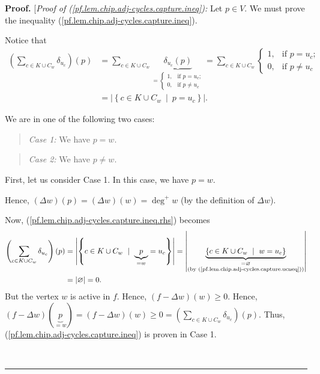 \documentclass[numbers=enddot,12pt,final,onecolumn,notitlepage]{scrartcl}%
\theoremstyle{definition}
\newenvironment{statement}{\begin{quote}}{\end{quote}}
\newenvironment{proof}[1][Proof]{\noindent\textbf{#1.} }{\ \rule{0.5em}{0.5em}}
\let\sumnonlimits\sum
\renewcommand{\sum}{\sumnonlimits\limits}
\newenvironment{noncompile}{}{}
\begin{document}
\begin{proof}
[\textit{Proof of (\ref{pf.lem.chip.adj-cycles.capture.ineq}):} Let $p\in V$.
We must prove the inequality (\ref{pf.lem.chip.adj-cycles.capture.ineq}).

Notice that%
\begin{align}
\left(  \sum_{c\in K\cup C_{w}}\delta_{u_{c}}\right)  \left(  p\right)    &
=\sum_{c\in K\cup C_{w}}\underbrace{\delta_{u_{c}}\left(  p\right)  }_{=%
\begin{cases}
1, & \text{if }p=u_{c};\\
0, & \text{if }p\neq u_{c}%
\end{cases}
}=\sum_{c\in K\cup C_{w}}%
\begin{cases}
1, & \text{if }p=u_{c};\\
0, & \text{if }p\neq u_{c}%
\end{cases}
\nonumber\\
& =\left\vert \left\{  c\in K\cup C_{w}\ \mid\ p=u_{c}\right\}  \right\vert
.\label{pf.lem.chip.adj-cycles.capture.ineq.rhs}%
\end{align}


We are in one of the following two cases:

\begin{statement}
\textit{Case 1:} We have $p=w$.
\end{statement}

\begin{statement}
\textit{Case 2:} We have $p\neq w$.
\end{statement}

First, let us consider Case 1. In this case, we have $p=w$.

\begin{noncompile}
Hence, $\left(  \Delta w\right)  \left(  p\right)  =\left(  \Delta w\right)
\left(  w\right)  =\deg^+ w$ (by the definition of $\Delta w$).
\end{noncompile}

Now, (\ref{pf.lem.chip.adj-cycles.capture.ineq.rhs}) becomes
\begin{align*}
\left(  \sum_{c\in K\cup C_{w}}\delta_{u_{c}}\right)  \left(  p\right)    &
=\left\vert \left\{  c\in K\cup C_{w}\ \mid\ \underbrace{p}_{=w}%
=u_{c}\right\}  \right\vert =\left\vert \underbrace{\left\{  c\in K\cup
C_{w}\ \mid\ w=u_{c}\right\}  }_{\substack{=\varnothing\\\text{(by
(\ref{pf.lem.chip.adj-cycles.capture.ucneq}))}}}\right\vert \\
& =\left\vert \varnothing\right\vert =0.
\end{align*}
But the vertex $w$ is active in $f$. Hence, $\left(  f-\Delta w\right)
\left(  w\right)  \geq0$. Hence, $\left(  f-\Delta w\right)  \left(
\underbrace{p}_{=w}\right)  =\left(  f-\Delta w\right)  \left(  w\right)
\geq0=\left(  \sum_{c\in K\cup C_{w}}\delta_{u_{c}}\right)  \left(  p\right)
$. Thus, (\ref{pf.lem.chip.adj-cycles.capture.ineq}) is proven in Case 1.


\end{proof}
\end{document}
